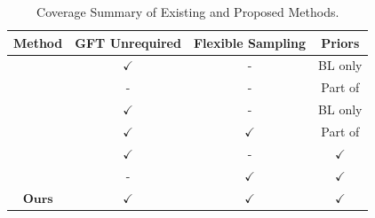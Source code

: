 \setlength{\textfloatsep}{5pt}
\begin{table}[t]
    \captionsetup{font=small} 
    \centering
    \caption{\small{Coverage Summary of Existing and Proposed Methods.}}
    \vspace{-5mm}
    \label{table:summary_existing_methods}
    \renewcommand{\arraystretch}{1.1}
    \small
    \begin{tabular}[t]{c||c|c|c}
        \toprule
            Method & GFT Unrequired & Flexible Sampling & Priors \\
        \midrule
            \cite{chen2015discrete} & $\checkmark$ & - & BL only \\ \hline
            \cite{tanaka2020sampling} & - & - & Part of \\ \hline
            \cite{jayawant2022practical} & $\checkmark$ & - & BL only \\ \hline
            \cite{hara2021design} & $\checkmark$ & $\checkmark$ & Part of \\ \hline
            \cite{hara2022gsss} & $\checkmark$ & - & $\checkmark$ \\ \hline
            \cite{hara2023graph} & - & $\checkmark$ & $\checkmark$ \\ \hline
            $\textbf{Ours}$ & $\checkmark$ & $\checkmark$ & $\checkmark$ \\
        \bottomrule
    \end{tabular}
\end{table}